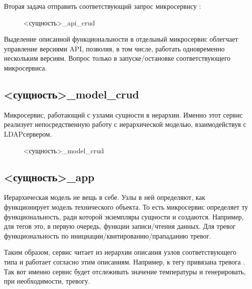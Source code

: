 \documentclass[a4paper,10pt,russian]{sphinxmanual}
\begin{document}
\sphinxAtStartPar
Вторая задача \sphinxhyphen{} отправить соответствующий запрос микросервису
:

\begin{figure}[htbp]
\centering
\capstart

\noindent{}
\caption{\textless{}сущность\textgreater{}\_api\_crud}\label{\detokenize{architecture:id24}}\end{figure}

\sphinxAtStartPar
Выделение описанной функциональности в отдельный микросервис облегчает
управление версиями API, позволяя, в том числе, работать одновременно
нескольким версиям. Вопрос только в запуске/остановке соответствующего
микросервиса.


\subsection{\textless{}сущность\textgreater{}\_model\_crud}
\label{\detokenize{architecture:model-crud}}
\sphinxAtStartPar
Микросервис, работающий с узлами сущности в иерархии. Именно этот сервис
реализует непосредственную работу с иерархической моделью, взаимодействуя
с LDAP\sphinxhyphen{}сервером.

\begin{figure}[htbp]
\centering
\capstart

\noindent{}
\caption{\textless{}сущность\textgreater{}\_model\_crud}\label{\detokenize{architecture:id25}}\end{figure}


\subsection{\textless{}сущность\textgreater{}\_app}
\label{\detokenize{architecture:app}}
\sphinxAtStartPar
Иерархическая модель \sphinxhyphen{} не вещь в себе. Узлы в ней определяют, как функционирует
модель технического объекта.
То есть микросервис  определяет ту функциональность, ради
которой экземпляры сущности и создаются.
Например, для тегов это, в первую очередь, функции записи/чтения данных.
Для тревог \sphinxhyphen{} функциональность по инициации/квитированию/прападанию тревог.

\sphinxAtStartPar
Таким образом, сервис  читает из иерархии описания
узлов соответствующего типа и работает согласно этим описаниям.
Например, к тегу  привязана тревога
. Так вот именно сервис  будет
отслеживать значение температуры и генерировать, при необходимости, тревогу.
\end{document}
